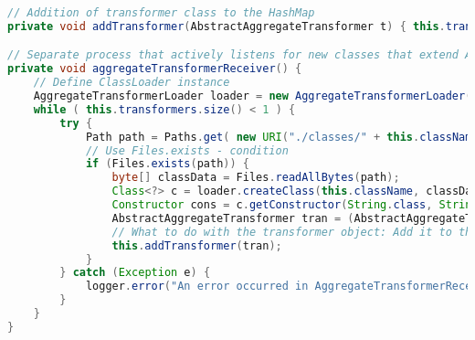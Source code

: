 \begin{lstlisting}[language=Java, caption={Dynamisk metode i Migrator som kjøres i separat tråd.}]
// Addition of transformer class to the HashMap
private void addTransformer(AbstractAggregateTransformer t) { this.transformers.put(t.getAppVersion(), t); }

// Separate process that actively listens for new classes that extend AAT
private void aggregateTransformerReceiver() {
    // Define ClassLoader instance
    AggregateTransformerLoader loader = new AggregateTransformerLoader();
    while ( this.transformers.size() < 1 ) {
        try {
            Path path = Paths.get( new URI("./classes/" + this.className + ".class"));
            // Use Files.exists - condition
            if (Files.exists(path)) {
                byte[] classData = Files.readAllBytes(path);
                Class<?> c = loader.createClass(this.className, classData);
                Constructor cons = c.getConstructor(String.class, String.class);
                AbstractAggregateTransformer tran = (AbstractAggregateTransformer) cons.newInstance( "x", "y" );
                // What to do with the transformer object: Add it to the AAT list
                this.addTransformer(tran);
            }
        } catch (Exception e) {
            logger.error("An error occurred in AggregateTransformerReceiver ", e);
        }
    }
}
\end{lstlisting}
